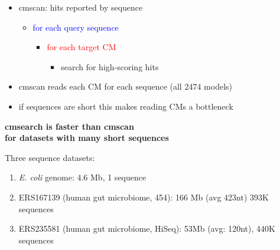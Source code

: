 \documentclass[landscape]{slides}
\begin{document}
\begin{slide}
\begin{slide}
\begin{itemize}
\item cmscan: hits reported by sequence
  \begin{itemize}
  \item \textcolor{blue}{for each query} \textcolor{blue}{sequence}
    \begin{itemize}
    \item \textcolor{red}{for each target} \textcolor{red}{CM}
      \begin{itemize}
      \item search for high-scoring hits
      \end{itemize}
    \end{itemize}
  \end{itemize}
\end{itemize}

\begin{itemize}
\item cmscan reads each CM for each sequence (all 2474 models)
\item if sequences are short this makes reading CMs a bottleneck
\end{itemize}

\vfill
\end{slide}
\begin{slide}
\begin{center}
\textbf{cmsearch is faster than cmscan \\ for datasets with many short sequences}
\end{center}
\medskip

\small

Three sequence datasets:
\begin{enumerate}
  \item \emph{E. coli} genome: 4.6 Mb, 1 sequence
  \item ERS167139 (human gut microbiome, 454): 166 Mb (avg 423nt) 393K sequences 
  \item ERS235581 (human gut microbiome, HiSeq): 53Mb (avg: 120nt), 440K sequences
\end{enumerate}

\begin{center}

\medskip
\medskip


\end{center}
\end{slide}
\end{slide}
\end{document}
